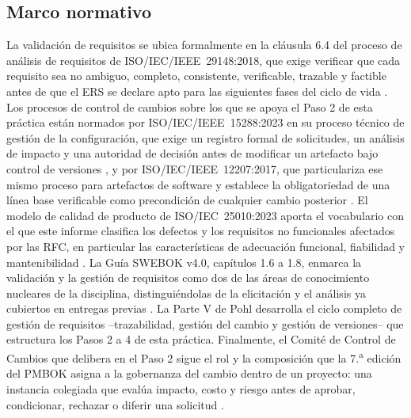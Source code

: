 \documentclass[11pt,a4paper]{article}
\begin{document}
\subsection{Marco normativo}
La validación de requisitos se ubica formalmente en la cláusula 6.4 del proceso de análisis de requisitos de ISO/IEC/IEEE~29148:2018, que exige verificar que cada requisito sea no ambiguo, completo, consistente, verificable, trazable y factible antes de que el ERS se declare apto para las siguientes fases del ciclo de vida \cite{iso29148}. Los procesos de control de cambios sobre los que se apoya el Paso 2 de esta práctica están normados por ISO/IEC/IEEE~15288:2023 en su proceso técnico de gestión de la configuración, que exige un registro formal de solicitudes, un análisis de impacto y una autoridad de decisión antes de modificar un artefacto bajo control de versiones \cite{iso15288}, y por ISO/IEC/IEEE~12207:2017, que particulariza ese mismo proceso para artefactos de software y establece la obligatoriedad de una línea base verificable como precondición de cualquier cambio posterior \cite{iso12207}. El modelo de calidad de producto de ISO/IEC~25010:2023 aporta el vocabulario con el que este informe clasifica los defectos y los requisitos no funcionales afectados por las RFC, en particular las características de adecuación funcional, fiabilidad y mantenibilidad \cite{iso25010}. La Guía SWEBOK v4.0, capítulos 1.6 a 1.8, enmarca la validación y la gestión de requisitos como dos de las áreas de conocimiento nucleares de la disciplina, distinguiéndolas de la elicitación y el análisis ya cubiertos en entregas previas \cite{swebok2024}. La Parte V de Pohl \cite{pohl2010} desarrolla el ciclo completo de gestión de requisitos --trazabilidad, gestión del cambio y gestión de versiones-- que estructura los Pasos 2 a 4 de esta práctica. Finalmente, el Comité de Control de Cambios que delibera en el Paso 2 sigue el rol y la composición que la 7.\textsuperscript{a} edición del PMBOK asigna a la gobernanza del cambio dentro de un proyecto: una instancia colegiada que evalúa impacto, costo y riesgo antes de aprobar, condicionar, rechazar o diferir una solicitud \cite{pmbok2021}.
\end{document}
